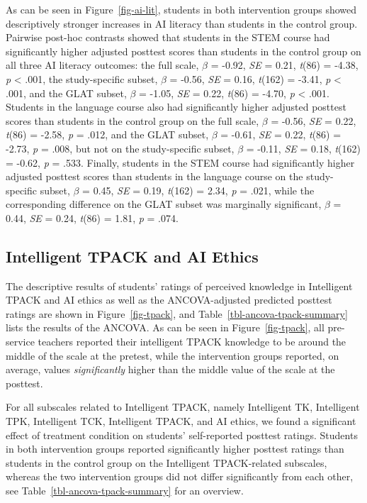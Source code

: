 \documentclass[
  letterpaper,
  DIV=11,
  numbers=noendperiod]{scrartcl}
\begin{document}
As can be seen in Figure~\ref{fig-ai-lit}, students in both intervention
groups showed descriptively stronger increases in AI literacy than
students in the control group. Pairwise post-hoc contrasts showed that
students in the STEM course had significantly higher adjusted posttest
scores than students in the control group on all three AI literacy
outcomes: the full scale, \(\beta\) = -0.92, \emph{SE} = 0.21,
\emph{t}(86) = -4.38, \emph{p} \textless{} .001, the study-specific
subset, \(\beta\) = -0.56, \emph{SE} = 0.16, \emph{t}(162) = -3.41,
\emph{p} \textless{} .001, and the GLAT subset, \(\beta\) = -1.05,
\emph{SE} = 0.22, \emph{t}(86) = -4.70, \emph{p} \textless{} .001.
Students in the language course also had significantly higher adjusted
posttest scores than students in the control group on the full scale,
\(\beta\) = -0.56, \emph{SE} = 0.22, \emph{t}(86) = -2.58, \emph{p} =
.012, and the GLAT subset, \(\beta\) = -0.61, \emph{SE} = 0.22,
\emph{t}(86) = -2.73, \emph{p} = .008, but not on the study-specific
subset, \(\beta\) = -0.11, \emph{SE} = 0.18, \emph{t}(162) = -0.62,
\emph{p} = .533. Finally, students in the STEM course had significantly
higher adjusted posttest scores than students in the language course on
the study-specific subset, \(\beta\) = 0.45, \emph{SE} = 0.19,
\emph{t}(162) = 2.34, \emph{p} = .021, while the corresponding
difference on the GLAT subset was marginally significant, \(\beta\) =
0.44, \emph{SE} = 0.24, \emph{t}(86) = 1.81, \emph{p} = .074.

\subsection{Intelligent TPACK and AI
Ethics}\label{intelligent-tpack-and-ai-ethics}

The descriptive results of students' ratings of perceived knowledge in
Intelligent TPACK and AI ethics as well as the ANCOVA-adjusted predicted
posttest ratings are shown in Figure~\ref{fig-tpack}, and
Table~\ref{tbl-ancova-tpack-summary} lists the results of the ANCOVA. As
can be seen in Figure~\ref{fig-tpack}, all pre-service teachers reported
their intelligent TPACK knowledge to be around the middle of the scale
at the pretest, while the intervention groups reported, on average,
values \emph{significantly} higher than the middle value of the scale at
the posttest.

For all subscales related to Intelligent TPACK, namely Intelligent TK,
Intelligent TPK, Intelligent TCK, Intelligent TPACK, and AI ethics, we
found a significant effect of treatment condition on students'
self-reported posttest ratings. Students in both intervention groups
reported significantly higher posttest ratings than students in the
control group on the Intelligent TPACK-related subscales, whereas the
two intervention groups did not differ significantly from each other,
see Table~\ref{tbl-ancova-tpack-summary} for an overview.
\end{document}
